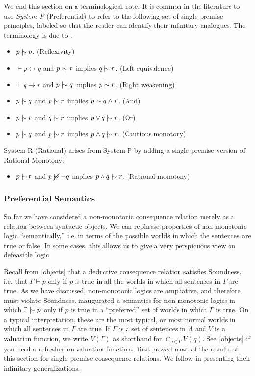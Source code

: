 We end this section on a terminological note. It is common in the literature to
use \textit{System P} (Preferential) to refer to the following set of
single-premise principles, labeled so that the reader can identify their
infinitary analogues. The terminology is due to \citet{kraus1990nonmonotonic}.
\begin{itemize}
\item[] $p\mathrel{\mid\hspace{-.08em}\!\sim} p$. \hfill(Reflexivity)
\item[] $\vdash p \leftrightarrow q$ and $p \mathrel{\mid\hspace{-.08em}\!\sim} r$ implies $q \mathrel{\mid\hspace{-.08em}\!\sim} r$.
\hfill(Left equivalence)
\item[] $\vdash q \rightarrow r$ and $p \mathrel{\mid\hspace{-.08em}\!\sim} q$ implies $p \mathrel{\mid\hspace{-.08em}\!\sim} r$. \hfill(Right
weakening)
\item[] $p \mathrel{\mid\hspace{-.08em}\!\sim} q$ and $p \mathrel{\mid\hspace{-.08em}\!\sim} r$ implies $p \mathrel{\mid\hspace{-.08em}\!\sim} q\wedge r$. \hfill(And)
\item[] $p \mathrel{\mid\hspace{-.08em}\!\sim} r$ and $q\mathrel{\mid\hspace{-.08em}\!\sim} r$ implies $p\vee q \mathrel{\mid\hspace{-.08em}\!\sim} r$. \hfill(Or)
\item[] $p\mathrel{\mid\hspace{-.08em}\!\sim} q$ and $p\mathrel{\mid\hspace{-.08em}\!\sim} r$ implies $p\wedge q \mathrel{\mid\hspace{-.08em}\!\sim} r.$ \hfill(Cautious
monotony)
\end{itemize}
System R (Rational) arises from System P by adding  a single-premise version of
Rational Monotony:
\begin{itemize}
\item[] $p\mathrel{\mid\hspace{-.08em}\!\sim} r$ and $p \mathrel{\cancel{\mathrel{\mid\hspace{-.08em}\!\sim}}} \neg q$ implies $p\wedge q \mathrel{\mid\hspace{-.08em}\!\sim} r$. \hfill(Rational
monotony)
\end{itemize}


\subsubsection{Preferential Semantics}
\label{KLMsemantics}
So far we have considered a non-monotonic consequence relation merely as a
relation between syntactic objects. We can rephrase properties of non-monotonic
logic ``semantically,'' i.e. in terms of the possible worlds in which the
sentences are true or false. In some cases, this allows us to give a very
perspicuous view on defeasible logic.

Recall from \autoref{objects} that a deductive consequence relation satisfies
Soundness, i.e. that $\Gamma \vdash p$ only if $p$ is true in all the worlds in
which all sentences in $\Gamma$ are true. As we have discussed, non-monotonic
logics are ampliative, and therefore must violate Soundness.
\citet{shoham1987semantical} inaugurated a semantics for non-monotonic logics in
which $\Gamma\mathrel{\mid\hspace{-.08em}\!\sim} p$ only if $p$ is true in a ``preferred'' set of worlds in
which $\Gamma$ is true. On a typical interpretation, these are the most typical,
or most normal worlds in which all sentences in $\Gamma$ are true.  If $\Gamma$
is a set of sentences in $\Lambda$ and $V$ is a valuation function, we write
$V(\Gamma)$ as shorthand for $\cap_{q\in \Gamma} V(q).$ See \autoref{objects} if
you need a refresher on valuation functions. \citet{kraus1990nonmonotonic} first
proved most of the results of this section for single-premise consequence
relations. We follow \citet{makinson1994general} in presenting their infinitary
generalizations.

